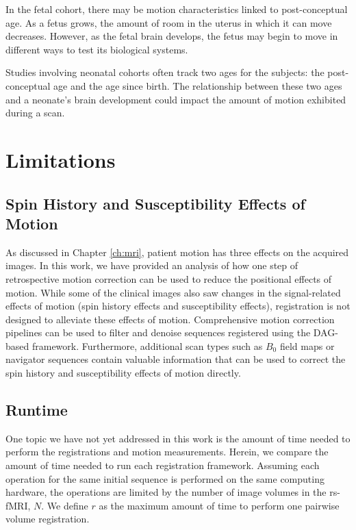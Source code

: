 In the fetal cohort, there may be motion characteristics linked to post-conceptual age. As a fetus grows, the amount of room in the uterus in which it can move decreases. However, as the fetal brain develops, the fetus may begin to move in different ways to test its biological systems. 

Studies involving neonatal cohorts often track two ages for the subjects: the post-conceptual age and the age since birth. The relationship between these two ages and a neonate's brain development could impact the amount of motion exhibited during a scan.

\section{Limitations}

\subsection{Spin History and Susceptibility Effects of Motion}

As discussed in Chapter \ref{ch:mri}, patient motion has three effects on the acquired images. In this work, we have provided an analysis of how one step of retrospective motion correction can be used to reduce the positional effects of motion. While some of the clinical images also saw changes in the signal-related effects of motion (spin history effects and susceptibility effects), registration is not designed to alleviate these effects of motion. Comprehensive motion correction pipelines can be used to filter and denoise sequences registered using the DAG-based framework. Furthermore, additional scan types such as $B_0$ field maps or navigator sequences contain valuable information that can be used to correct the spin history and susceptibility effects of motion directly.

\subsection{Runtime}

One topic we have not yet addressed in this work is the amount of time needed to perform the registrations and motion measurements. Herein, we compare the amount of time needed to run each registration framework. Assuming each operation for the same initial sequence is performed on the same computing hardware, the operations are limited by the number of image volumes in the rs-fMRI, $N$. We define $r$ as the maximum amount of time to perform one pairwise volume registration.

